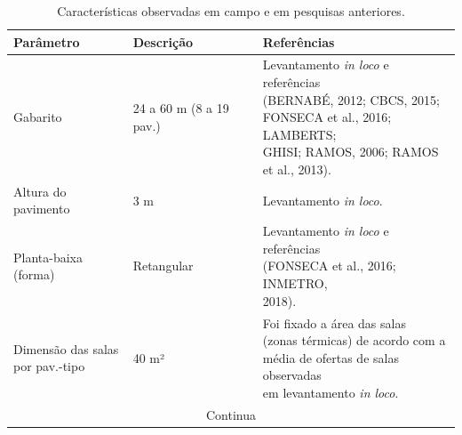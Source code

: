 \begin{table}[ht]\centering
    \caption{\small Características observadas em campo e em pesquisas anteriores.}
    \vspace*{0.2cm}
    \label{tab:tabela4}
    \begin{tabular*}{\columnwidth}{@{\extracolsep{\fill}}lll}
    \hline
    \textbf{Parâmetro}                                             & \textbf{Descrição}                                                                    & \textbf{Referências} \\ \hline
    Gabarito                                                       & 24 a 60 m (8 a 19 pav.)                                                               & \makecell[l]{Levantamento \textit{in loco} e referências\\ (BERNABÉ, 2012; CBCS, 2015; \\FONSECA et al., 2016; LAMBERTS; \\GHISI; RAMOS, 2006; RAMOS \\et al., 2013).} \\ \hline
    Altura do pavimento                                            & 3 m                                                                                   & Levantamento \textit{in loco}.                                                                                                                                         \\ \hline
    Planta-baixa (forma)                                           & Retangular                                                                            & \makecell[l]{Levantamento \textit{in loco} e referências\\ (FONSECA et al., 2016; INMETRO,\\ 2018).}                                                                   \\ \hline
    \makecell[l]{Dimensão das salas\\ por pav.-tipo}               & 40 m²                                                                                 & \makecell[l]{Foi fixado a área das salas \\(zonas térmicas) de acordo com a \\média de ofertas de salas observadas\\ em levantamento \textit{in loco}.}                  \\ \hline
    \multicolumn{3}{c}{Continua}\\\hline
    \end{tabular*}
\end{table}\pagebreak
